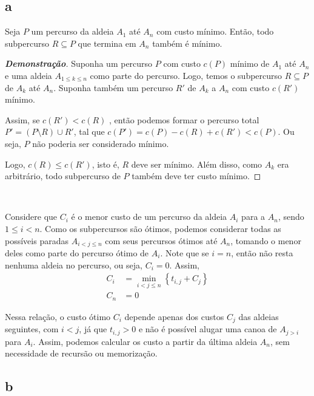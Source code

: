 \subsection{a} \label{sec:2:a}

\begin{theorem}
    Seja $P$ um percurso da aldeia $A_1$ até $A_n$ com custo mínimo. Então, todo subpercurso $R \subseteq P$ que termina em $A_n$ também é mínimo.
\end{theorem}

\begin{proof}[\textbf{Demonstração}]
    Suponha um percurso $P$ com custo $c(P)$ mínimo de $A_1$ até $A_n$ e uma aldeia $A_{1 \leq k \leq n}$ como parte do percurso. Logo, temos o subpercurso $R \subseteq P$ de $A_k$ até $A_n$. Suponha também um percurso $R'$ de $A_k$ a $A_n$ com custo $c\left(R'\right)$ mínimo.

    Assim, se $c\left(R'\right) < c(R)$ , então podemos formar o percurso total $P' = (P \setminus R) \cup R'$, tal que $c\left(P'\right) = c(P) - c(R) + c\left(R'\right) < c(P)$. Ou seja, $P$ não poderia ser considerado mínimo.

    Logo, $c(R) \leq c\left(R'\right)$, isto é, $R$ deve ser mínimo. Além disso, como $A_k$ era arbitrário, todo subpercurso de $P$ também deve ter custo mínimo.
\end{proof}

~

Considere que $C_i$ é o menor custo de um percurso da aldeia $A_i$ para a $A_n$, sendo $1 \leq i < n$. Como os subpercursos são ótimos, podemos considerar todas as possíveis paradas $A_{i < j \leq n}$ com seus percursos ótimos até $A_n$, tomando o menor deles como parte do percurso ótimo de $A_i$. Note que se $i = n$, então não resta nenhuma aldeia no percurso, ou seja, $C_i = 0$. Assim,
\begin{align*}
    C_i &= \min_{i < j \leq n}\left\{t_{i, j} + C_j\right\} \\
    C_n &= 0
\end{align*}

Nessa relação, o custo ótimo $C_i$ depende apenas dos custos $C_j$ das aldeias seguintes, com $i < j$, já que $t_{i, j} > 0$ e não é possível alugar uma canoa de $A_{j > i}$ para $A_i$. Assim, podemos calcular os custo a partir da última aldeia $A_n$, sem necessidade de recursão ou memorização.

\itemdsep
\subsection{b}

